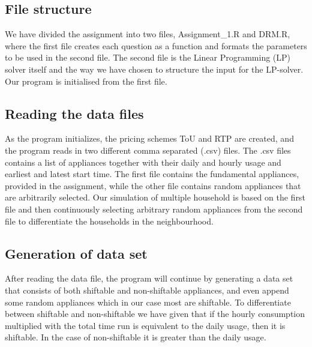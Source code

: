 \documentclass[
11pt, %
english, %
singlespacing, %
parskip, %
headsepline, %
]{report} %
\begin{document}

	\subsection{File structure}
	We have divided the assignment into two files, Assignment\_1.R and DRM.R, where the first file creates each question as a function and formats the parameters to be used in the second file. The second file is the Linear Programming (LP) solver itself and the way we have chosen to structure the input for the LP-solver. Our program is initialised from the first file.

	\subsection{Reading the data files }
	As the program initializes, the pricing schemes ToU and RTP are created, and the program reads in two different comma separated (.csv) files. The .csv files contains a list of appliances together with their daily and hourly usage and earliest and latest start time. The first file contains the fundamental appliances, provided in the assignment, while the other file contains random appliances that are arbitrarily selected. Our simulation of multiple household is based on the first file and then continuously selecting arbitrary random appliances from the second file to differentiate the households in the neighbourhood.


	\subsection{Generation of data set}
	After reading the data file, the program will continue by generating a data set that consists of both shiftable and non-shiftable appliances, and even append some random appliances which in our case most are shiftable. To differentiate between shiftable and non-shiftable we have given that if the hourly consumption multiplied with the total time run is equivalent to the daily usage, then it is shiftable. In the case of non-shiftable it is greater than the daily usage.
\end{document}
